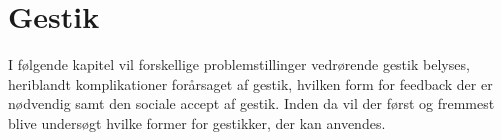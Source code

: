 \chapter{Gestik}
\label{Gestik}
%
I følgende kapitel vil forskellige problemstillinger vedrørende gestik belyses, heriblandt komplikationer forårsaget af gestik, hvilken form for feedback der er nødvendig samt den sociale accept af gestik. Inden da vil der først og fremmest blive undersøgt hvilke former for gestikker, der kan anvendes.  
%
